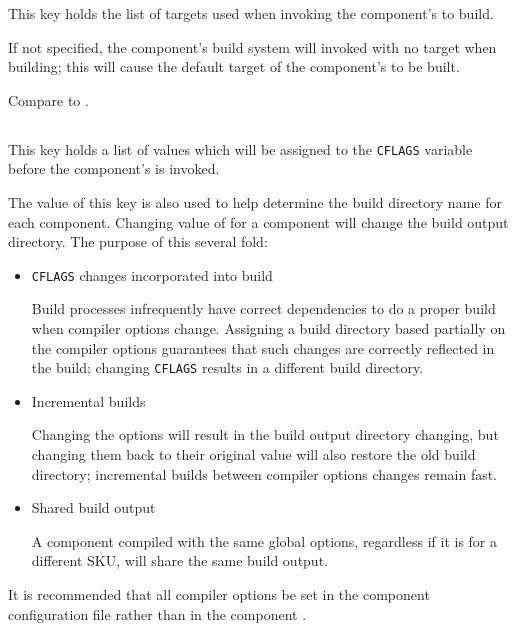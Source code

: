 This key holds the list of targets used when invoking the component's
\makefile to build.

If not specified, the component's build system will invoked with no
target when building; this will cause the default target of the
component's \makefile to be built.

Compare to .


\subsection{}\label{variables:cflags}

This key holds a list of values which will be assigned to the
\texttt{CFLAGS} variable before the component's \makefile is invoked.

The value of this key is also used to help determine the build
directory name for each component.  Changing value of
 for a component will change the build
output directory. The purpose of this several fold:

\begin{itemize}
\item \texttt{CFLAGS} changes incorporated into build

  Build processes infrequently have correct dependencies to do a
  proper build when compiler options change.  Assigning a build
  directory based partially on the compiler options guarantees that
  such changes are correctly reflected in the build; changing
  \texttt{CFLAGS} results in a different build directory.

\item Incremental builds

  Changing the options will result in the build output directory
  changing, but changing them back to their original value will also
  restore the old build directory; incremental builds between compiler
  options changes remain fast.

\item Shared build output

  A component compiled with the same global options, regardless if it
  is for a different SKU, will share the same build output.
\end{itemize}

It is recommended that all compiler options be set in the component
configuration file rather than in the component \makefile.

